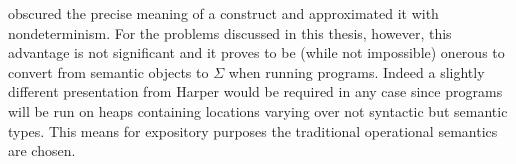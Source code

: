obscured the precise meaning of a construct and approximated it with
nondeterminism. For the problems discussed in this thesis, however,
this advantage is not significant and it proves to be (while not
impossible) onerous to convert from semantic objects to $\Sigma$ when
running programs. Indeed a slightly different presentation from Harper
would be required in any case since programs will be run on heaps
containing locations varying over not syntactic but semantic
types. This means for expository purposes the traditional operational
semantics are chosen.
